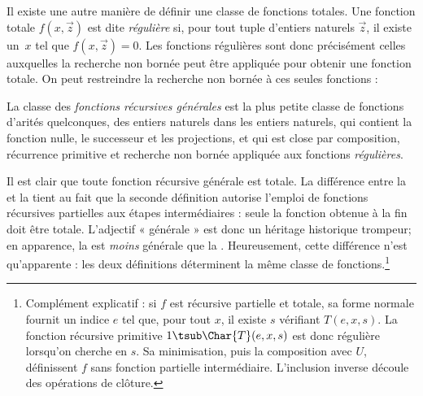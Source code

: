 \documentclass[../../../include/open-logic-section]{subfiles}
\begin{document}

Il existe une autre manière de définir une classe de fonctions
totales. Une fonction totale $f(x,\vec z)$ est dite
\emph{régulière} si, pour tout tuple d'entiers naturels
$\vec z$, il existe un~$x$ tel que $f(x,\vec z)=0$.
Les fonctions régulières sont donc précisément celles
auxquelles la recherche non bornée peut être appliquée
pour obtenir une fonction totale. On peut restreindre
la recherche non bornée à ces seules fonctions :

\begin{defn}
La classe des \emph{fonctions récursives générales}
est la plus petite classe de fonctions d'arités quelconques,
des entiers naturels dans les entiers naturels, qui contient
la fonction nulle, le successeur et les projections, et
qui est close par composition, récurrence primitive et
recherche non bornée appliquée aux fonctions
\emph{régulières}.
\end{defn}

Il est clair que toute fonction récursive générale est
totale. La différence entre la
 et la
 tient au fait que la seconde
définition autorise l'emploi de fonctions récursives
partielles aux étapes intermédiaires : seule la fonction
obtenue à la fin doit être totale. L'adjectif « générale »
est donc un héritage historique trompeur; en apparence,
la  est \emph{moins} générale
que la . Heureusement, cette
différence n'est qu'apparente : les deux définitions
déterminent la même classe de fonctions.\footnote{Complément explicatif : si $f$ est récursive partielle et totale, sa forme normale fournit un indice $e$ tel que, pour tout $x$, il existe $s$ vérifiant $T(e,x,s)$. La fonction récursive primitive $1\tsub\Char{T}(e,x,s)$ est donc régulière lorsqu'on cherche en $s$. Sa minimisation, puis la composition avec $U$, définissent $f$ sans fonction partielle intermédiaire. L'inclusion inverse découle des opérations de clôture.}
\end{document}
